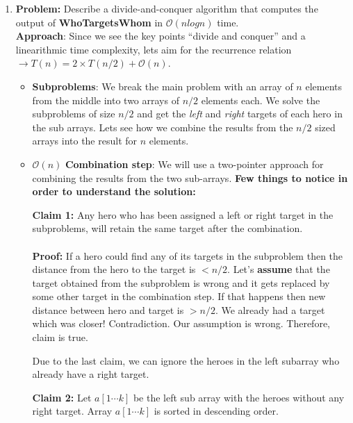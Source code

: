 \documentclass[11pt, fleqn]{article}
\begin{document}
\begin{enumerate}
    \item \textbf{Problem:} Describe a divide-and-conquer algorithm that computes the output of \textbf{WhoTargetsWhom} in $\mathcal{O}(nlogn)$ time. 
    ~\\
    
    \textbf{Approach}: Since we see the key points ``divide and conquer'' and a linearithmic time complexity, lets aim for the recurrence relation $\longrightarrow T(n) = 2\times T(n/2) + \mathcal{O}(n)$.
    \begin{itemize}
        \item \textbf{Subproblems}: We break the main problem with an array of $n$ elements from the middle into two arrays of $n/2$ elements each. We solve the subproblems of size $n/2$ and get the \textit{left} and \textit{right} targets of each hero in the sub arrays. Lets see how we combine the results from the $n/2$ sized arrays into the result for $n$ elements.
        
        \item $\mathcal{O}(n)$ \textbf{Combination step}: We will use a two-pointer approach for combining the results from the two sub-arrays. \textbf{Few things to notice in order to understand the solution:}
        \medskip
        
        \textbf{Claim 1: } Any hero who has been assigned a left or right target in the subproblems, will retain the same target after the combination.
        \paragraph{}
        \textbf{Proof: } If a hero could find any of its targets in the subproblem then the distance from the hero to the target is $< n/2$. Let's \textbf{assume} that the target obtained from the subproblem is wrong and it gets replaced by some other target in the combination step. If that happens then new distance between hero and target is $> n/2$. We already had a target which was closer! Contradiction. Our assumption is wrong. Therefore, claim is true.
        
        \medskip
        
        Due to the last claim, we can ignore the heroes in the left subarray who already have a right target.
        \medskip
        
        \textbf{Claim 2: } Let $a[1 \cdots k]$ be the left sub array with the heroes without any right target. Array $a[1 \cdots k]$ is sorted in descending order.

\end{itemize}
\end{enumerate}
\end{document}
